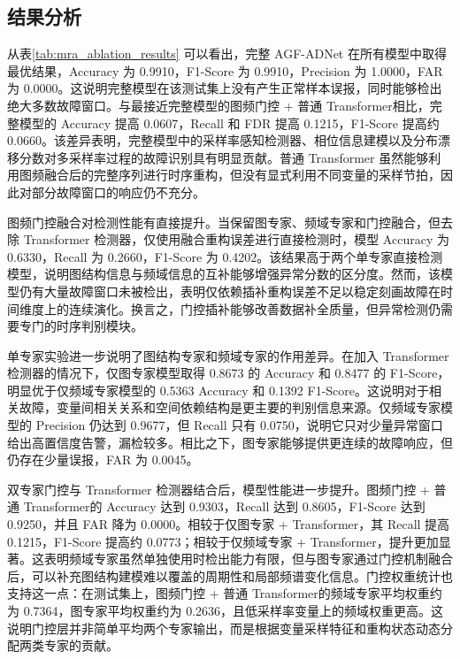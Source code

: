 \documentclass[bachelor, vlined]{DissertUESTC}
\begin{document}
    \subsection{结果分析}

    从表\ref{tab:mra_ablation_results} 可以看出，完整 AGF-ADNet 在所有模型中取得最优结果，Accuracy 为 0.9910，F1-Score 为 0.9910，Precision 为 1.0000，FAR 为 0.0000。这说明完整模型在该测试集上没有产生正常样本误报，同时能够检出绝大多数故障窗口。与最接近完整模型的图频门控 + 普通 Transformer相比，完整模型的 Accuracy 提高 0.0607，Recall 和 FDR 提高 0.1215，F1-Score 提高约 0.0660。该差异表明，完整模型中的采样率感知检测器、相位信息建模以及分布漂移分数对多采样率过程的故障识别具有明显贡献。普通 Transformer 虽然能够利用图频融合后的完整序列进行时序重构，但没有显式利用不同变量的采样节拍，因此对部分故障窗口的响应仍不充分。

    图频门控融合对检测性能有直接提升。当保留图专家、频域专家和门控融合，但去除 Transformer 检测器，仅使用融合重构误差进行直接检测时，模型 Accuracy 为 0.6330，Recall 为 0.2660，F1-Score 为 0.4202。该结果高于两个单专家直接检测模型，说明图结构信息与频域信息的互补能够增强异常分数的区分度。然而，该模型仍有大量故障窗口未被检出，表明仅依赖插补重构误差不足以稳定刻画故障在时间维度上的连续演化。换言之，门控插补能够改善数据补全质量，但异常检测仍需要专门的时序判别模块。

    单专家实验进一步说明了图结构专家和频域专家的作用差异。在加入 Transformer 检测器的情况下，仅图专家模型取得 0.8673 的 Accuracy 和 0.8477 的 F1-Score，明显优于仅频域专家模型的 0.5363 Accuracy 和 0.1392 F1-Score。这说明对于相关故障，变量间相关关系和空间依赖结构是更主要的判别信息来源。仅频域专家模型的 Precision 仍达到 0.9677，但 Recall 只有 0.0750，说明它只对少量异常窗口给出高置信度告警，漏检较多。相比之下，图专家能够提供更连续的故障响应，但仍存在少量误报，FAR 为 0.0045。

    双专家门控与 Transformer 检测器结合后，模型性能进一步提升。图频门控 + 普通 Transformer的 Accuracy 达到 0.9303，Recall 达到 0.8605，F1-Score 达到 0.9250，并且 FAR 降为 0.0000。相较于仅图专家 + Transformer，其 Recall 提高 0.1215，F1-Score 提高约 0.0773；相较于仅频域专家 + Transformer，提升更加显著。这表明频域专家虽然单独使用时检出能力有限，但与图专家通过门控机制融合后，可以补充图结构建模难以覆盖的周期性和局部频谱变化信息。门控权重统计也支持这一点：在测试集上，图频门控 + 普通 Transformer的频域专家平均权重约为 0.7364，图专家平均权重约为 0.2636，且低采样率变量上的频域权重更高。这说明门控层并非简单平均两个专家输出，而是根据变量采样特征和重构状态动态分配两类专家的贡献。
\end{document}
